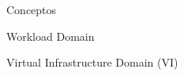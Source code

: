 \begin{section}{Conceptos}
\begin{subsection}{Workload Domain}
\begin{subsubsection}{Virtual Infrastructure Domain (VI)}




\end{subsubsection}
\end{subsection}
\end{section}
